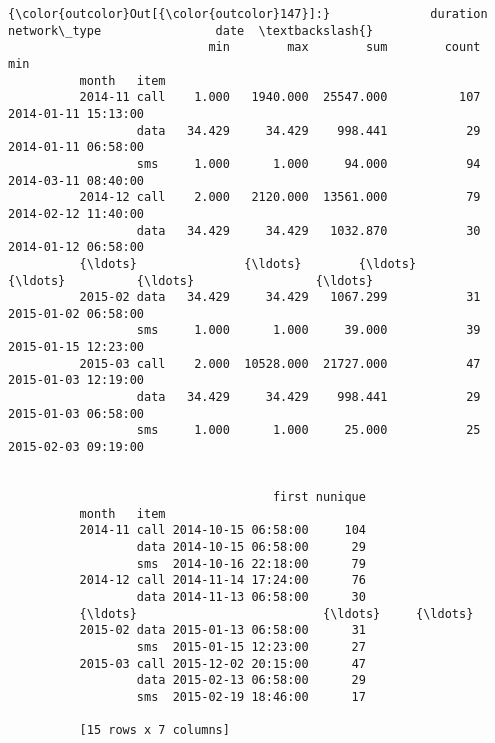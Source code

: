 \documentclass[11pt]{article}
\begin{document}
\begin{Verbatim}[commandchars=\\\{\}]
{\color{outcolor}Out[{\color{outcolor}147}]:}              duration                       network\_type                date  \textbackslash{}
                            min        max        sum        count                 min   
          month   item                                                                   
          2014-11 call    1.000   1940.000  25547.000          107 2014-01-11 15:13:00   
                  data   34.429     34.429    998.441           29 2014-01-11 06:58:00   
                  sms     1.000      1.000     94.000           94 2014-03-11 08:40:00   
          2014-12 call    2.000   2120.000  13561.000           79 2014-02-12 11:40:00   
                  data   34.429     34.429   1032.870           30 2014-01-12 06:58:00   
          {\ldots}               {\ldots}        {\ldots}        {\ldots}          {\ldots}                 {\ldots}   
          2015-02 data   34.429     34.429   1067.299           31 2015-01-02 06:58:00   
                  sms     1.000      1.000     39.000           39 2015-01-15 12:23:00   
          2015-03 call    2.000  10528.000  21727.000           47 2015-01-03 12:19:00   
                  data   34.429     34.429    998.441           29 2015-01-03 06:58:00   
                  sms     1.000      1.000     25.000           25 2015-02-03 09:19:00   
          
                                                    
                                     first nunique  
          month   item                              
          2014-11 call 2014-10-15 06:58:00     104  
                  data 2014-10-15 06:58:00      29  
                  sms  2014-10-16 22:18:00      79  
          2014-12 call 2014-11-14 17:24:00      76  
                  data 2014-11-13 06:58:00      30  
          {\ldots}                          {\ldots}     {\ldots}  
          2015-02 data 2015-01-13 06:58:00      31  
                  sms  2015-01-15 12:23:00      27  
          2015-03 call 2015-12-02 20:15:00      47  
                  data 2015-02-13 06:58:00      29  
                  sms  2015-02-19 18:46:00      17  
          
          [15 rows x 7 columns]
\end{Verbatim}
            
\end{document}

